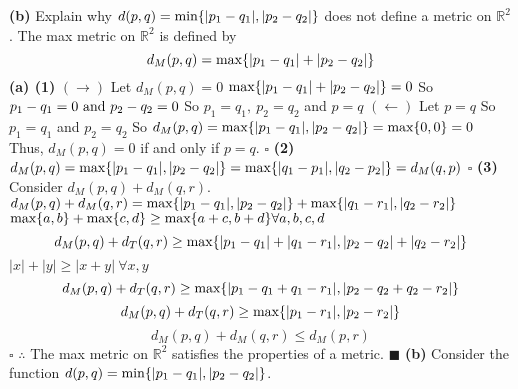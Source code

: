 \documentclass[12pt]{article}
\begin{document}
  \textbf{(b)} Explain why \(d(p,q) = \textup{min}\{|p_1-q_1|,|p_2-q_2|\}\) does not define a metric on \(\mathbb{R}^2\).
  \newline \newline
  The max metric on \(\mathbb{R}^2\) is defined by
  \[d_M(p,q) = \textup{max}\{|p_1-q_1|+|p_2-q_2|\}\]
  \newline
  \textbf{(a) (1)} \((\rightarrow)\) Let \(d_M(p,q) = 0\)
  \newline
  \(\textup{max}\{|p_1-q_1|+|p_2-q_2|\} = 0\)
  \newline
  So \(p_1-q_1 = 0 \textup{ and } p_2-q_2 = 0\)
  \newline
  So \(p_1 = q_1,\ p_2 = q_2\) and \(p = q\)
  \newline \newline
  \((\leftarrow)\) Let \(p = q\)
  \newline
  So \(p_1 = q_1\) and \(p_2 = q_2\)
  \newline
  So \(d_M(p,q) = \textup{max}\{|p_1-q_1|,|p_2-q_2|\} = \textup{max}\{0,0\} = 0\)
  \newline
  Thus, \(d_M(p,q) = 0\) if and only if \(p = q\).
  \newline \(\square\) \newline
  \textbf{(2)} \(d_M(p,q) = \textup{max}\{|p_1-q_1|,|p_2-q_2|\} = \textup{max}\{|q_1-p_1|,|q_2-p_2|\} = d_M(q,p)\)
  \newline \(\square\) \newline
  \textbf{(3)} Consider \(d_M(p,q) + d_M(q,r)\).
  \newline
  \(d_M(p,q) + d_M(q,r) = \textup{max}\{|p_1-q_1|,|p_2-q_2|\} + \textup{max}\{|q_1-r_1|,|q_2-r_2|\}\)
  \newline
  \(\textup{max}\{a,b\} + \textup{max}\{c,d\} \geq \textup{max}\{a+c, b+d\} \forall a,b,c,d\)
  \newline
  \[d_M(p,q) + d_T(q,r) \geq \textup{max}\{|p_1-q_1| + |q_1-r_1|, |p_2-q_2| + |q_2-r_2|\}\]
  \(|x| + |y| \geq |x+y|\ \forall x,y\)
  \[d_M(p,q) + d_T(q,r) \geq \textup{max}\{|p_1-q_1 + q_1-r_1|, |p_2-q_2 + q_2-r_2|\}\]
  \[d_M(p,q) + d_T(q,r) \geq \textup{max}\{|p_1 - r_1|, |p_2 - r_2|\}\]
  \[d_M(p,q) + d_M(q,r) \leq d_M(p,r)\]
  \(\square\)
  \newline
  \(\therefore\) The max metric on \(\mathbb{R}^2\) satisfies the properties of a metric.
  \newline \(\blacksquare\) \newline \newline
  \textbf{(b)} Consider the function \(d(p,q) = \textup{min}\{|p_1-q_1|,|p_2-q_2|\}\).
\end{document}
